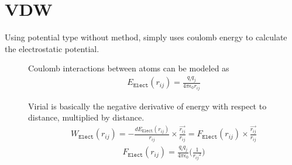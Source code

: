 \documentclass[letterpaper,10pt,english]{sphinxmanual}
\begin{document}
\section{VDW}
\label{\detokenize{electrostatic:vdw}}
\sphinxAtStartPar
Using  potential type without  method, simply uses coulomb energy to calculate the electrostatic potential.
\begin{description}
\item[{}] \leavevmode
\sphinxAtStartPar
Coulomb interactions between atoms can be modeled as
\begin{equation*}
\begin{split}E_{\texttt{Elect}}(r_{ij}) = \frac{q_i q_j}{4\pi \epsilon_0 r_{ij}}\end{split}
\end{equation*}
\item[{}] \leavevmode
\sphinxAtStartPar
Virial is basically the negative derivative of energy with respect to distance, multiplied by distance.
\begin{equation*}
\begin{split}W_{\texttt{Elect}}(r_{ij}) = -\frac{dE_{\texttt{Elect}}(r_{ij})}{r_{ij}}\times \frac{\overrightarrow{r_{ij}}}{{r_{ij}}} = F_{\texttt{Elect}}(r_{ij}) \times \frac{\overrightarrow{r_{ij}}}{{r_{ij}}}\end{split}
\end{equation*}\begin{equation*}
\begin{split}F_{\texttt{Elect}}(r_{ij}) = \frac{q_i q_j}{4\pi \epsilon_0} \Big( \frac{1}{{r_{ij}}^2} \Big)\end{split}
\end{equation*}
\end{description}
\end{document}
